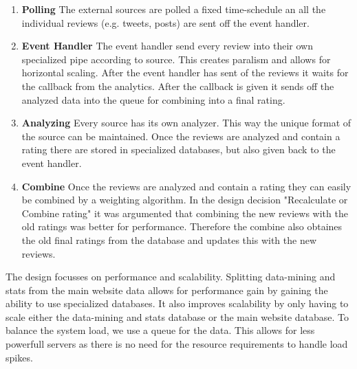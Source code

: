 \begin{enumerate}
\item {\bf Polling} The external sources are polled a fixed time-schedule an all the individual reviews (e.g. tweets, posts) are sent off the event handler.
\item {\bf Event Handler} The event handler send every review into their own specialized pipe according to source. This creates paralism and allows for horizontal scaling. After the event handler has sent of the reviews it waits for the callback from the analytics. After the callback is given it sends off the analyzed data into the queue for combining into a final rating.
 \item {\bf Analyzing} Every source has its own analyzer. This way the unique format of the source can be maintained. Once the reviews are analyzed and contain a rating there are stored in specialized databases, but also given back to the event handler.
\item {\bf Combine} Once the reviews are analyzed and contain a rating they can easily be combined by a weighting algorithm. In the design decision "Recalculate or Combine rating" it was argumented that combining the new reviews with the old ratings was better for performance. Therefore the combine also obtaines the old final ratings from the database and updates this with the new reviews.
\end{enumerate}

The design focusses on performance and scalability. Splitting data-mining and stats from the main website data allows for performance gain by gaining the ability to use specialized databases. It also improves scalability by only having to scale either the data-mining and stats database or the main website database. To balance the system load, we use a queue for the data. This allows for less powerfull servers as there is no need for the resource requirements to handle load spikes.
